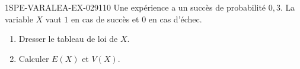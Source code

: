 \begin{exercice}{1SPE-VARALEA-EX-029}{1}{10}
Une expérience a un succès de probabilité $0{,}3$. La variable $X$ vaut $1$ en cas de succès et $0$ en cas d'échec.

\begin{enumerate}
  \item Dresser le tableau de loi de $X$.
  \item Calculer $E(X)$ et $V(X)$.
\end{enumerate}
\end{exercice}
